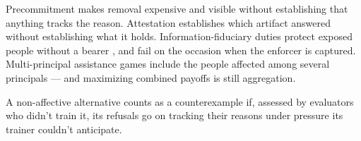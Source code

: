 
Precommitment makes removal expensive and visible without establishing that anything tracks the reason. Attestation establishes which artifact answered without establishing what it holds. Information-fiduciary duties protect exposed people without a bearer \autocite{balkin2016fiduciaries}, and fail on the occasion when the enforcer is captured. Multi-principal assistance games include the people affected among several principals \autocite{fickinger2020multiprincipal} — and maximizing combined payoffs is still aggregation.


A non-affective alternative counts as a counterexample if, assessed by evaluators who didn't train it, its refusals go on tracking their reasons under pressure its trainer couldn't anticipate.
